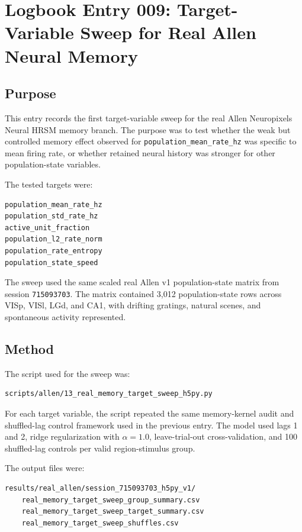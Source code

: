 \section{Logbook Entry 009: Target-Variable Sweep for Real Allen Neural Memory}
\label{sec:logbook-entry-009-real-allen-target-sweep}

\subsection{Purpose}

This entry records the first target-variable sweep for the real Allen Neuropixels Neural HRSM memory branch. The purpose was to test whether the weak but controlled memory effect observed for \texttt{population\_mean\_rate\_hz} was specific to mean firing rate, or whether retained neural history was stronger for other population-state variables.

The tested targets were:

\begin{verbatim}
population_mean_rate_hz
population_std_rate_hz
active_unit_fraction
population_l2_rate_norm
population_rate_entropy
population_state_speed
\end{verbatim}

The sweep used the same scaled real Allen v1 population-state matrix from session \texttt{715093703}. The matrix contained 3,012 population-state rows across VISp, VISl, LGd, and CA1, with drifting gratings, natural scenes, and spontaneous activity represented.

\subsection{Method}

The script used for the sweep was:

\begin{verbatim}
scripts/allen/13_real_memory_target_sweep_h5py.py
\end{verbatim}

For each target variable, the script repeated the same memory-kernel audit and shuffled-lag control framework used in the previous entry. The model used lags 1 and 2, ridge regularization with \(\alpha = 1.0\), leave-trial-out cross-validation, and 100 shuffled-lag controls per valid region-stimulus group.

The output files were:

\begin{verbatim}
results/real_allen/session_715093703_h5py_v1/
    real_memory_target_sweep_group_summary.csv
    real_memory_target_sweep_target_summary.csv
    real_memory_target_sweep_shuffles.csv
\end{verbatim}

